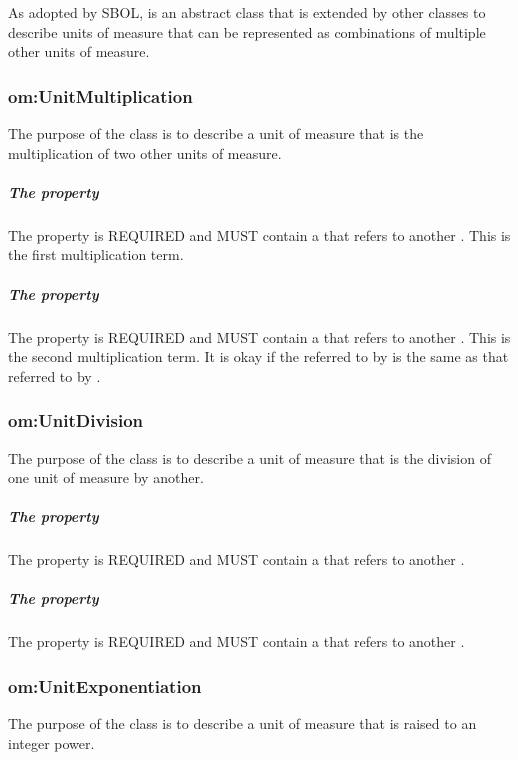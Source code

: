 As adopted by SBOL,  is an abstract class that is extended by other classes to describe units of measure that can be represented as combinations of multiple other units of measure.

\subsubsection{om:UnitMultiplication}
\label{sec:om:UnitMultiplication}

The purpose of the  class is to describe a unit of measure that is the multiplication of two other units of measure. 

\subparagraph{The  property}\label{sec:om:hasTerm1}
The  property is REQUIRED and MUST contain a  that refers to another . This  is the first multiplication term.

\subparagraph{The  property}\label{sec:om:hasTerm2}
The  property is REQUIRED and MUST contain a  that refers to another . This  is the second multiplication term. It is okay if the  referred to by  is the same as that referred to by .

\subsubsection{om:UnitDivision}
\label{sec:om:UnitDivision}

The purpose of the  class is to describe a unit of measure that is the division of one unit of measure by another.

\subparagraph{The  property}\label{sec:om:hasNumerator}
The  property is REQUIRED and MUST contain a  that refers to another .

\subparagraph{The  property}\label{sec:om:hasDenominator}
The  property is REQUIRED and MUST contain a  that refers to another .

\subsubsection{om:UnitExponentiation}
\label{sec:om:UnitExponentiation}

The purpose of the  class is to describe a unit of measure that is raised to an integer power.

